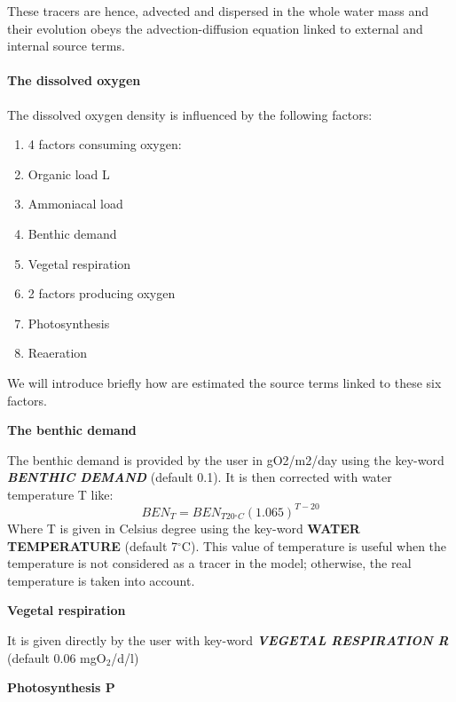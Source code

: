  These tracers are hence, advected and dispersed in the whole water mass and their evolution obeys the advection-diffusion equation linked to external and internal source terms.


\paragraph{ The dissolved oxygen}

 The dissolved oxygen density is influenced by the following factors:

\begin{enumerate}
\item  4 factors consuming oxygen:

\item  Organic load L

\item  Ammoniacal load

\item  Benthic demand

\item  Vegetal respiration

\item  2 factors producing oxygen

\item  Photosynthesis

\item  Reaeration
\end{enumerate}

 We will introduce briefly how are estimated the source terms linked to these six factors.




{\bf  The benthic demand}

 The benthic demand is provided by the user in gO2/m2/day using the key-word \textbf{\textit{BENTHIC DEMAND}} (default 0.1). It is then corrected with water temperature T like:
\[{BEN}_T={BEN}_{T20{}^\circ C}{\left(1.065\right)}^{T-20}\]
Where T is given in Celsius degree using the key-word \textbf{WATER TEMPERATURE} (default 7${}^\circ$C). This value of temperature is useful when the temperature is not considered as a tracer in the model; otherwise, the real temperature is taken into account.




{\bf  Vegetal respiration}

 It is given directly by the user with key-word \textbf{\textit{VEGETAL RESPIRATION R}} (default 0.06 mgO${}_{2}$/d/l)


{\bf  Photosynthesis P}

